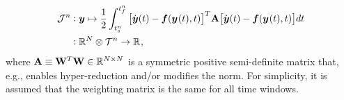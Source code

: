 \begin{equation}\label{eq:obj}
\begin{split} \mathcal{J}^n &\vcentcolon \statey \mapsto
\frac{1}{2} \int_{\timeStartArg{n}}^{\timeEndArg{n}} \big[ \dot{\statey}(t)
- \velocity(\stateyArg{}{t},t) \big]^T \stweightingMatArgt{n}{t} \big[
\dot{\statey}(t) - \velocity(\stateyArg{}{t},t) \big] d t \\
&\vcentcolon \RR{\fomdim}\otimes \timeSpaceArg{n}  \rightarrow
\RR{}, 
\end{split}
\end{equation}
where $\stweightingMatArg{n} \equiv \stweightingMatOneArg{ }^T \stweightingMatOneArg{ } \in \RR{\fomdim \times \fomdim}$ is a
symmetric positive semi-definite matrix that, e.g., enables hyper-reduction and/or modifies the norm. For simplicity, 
it is assumed that the weighting matrix is the same for all time windows. 

